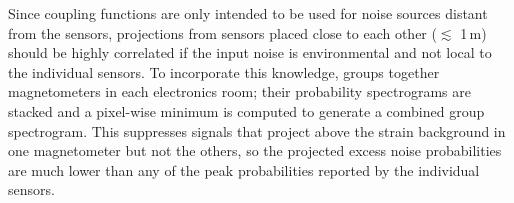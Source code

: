 Since coupling functions are only intended to be used for noise sources distant from the sensors, projections from sensors placed close to each other ($\lesssim$ 1\,m) should be highly correlated if the input noise is environmental and not local to the individual sensors.
To incorporate this knowledge,  groups together magnetometers in each electronics room; their probability spectrograms are stacked and a pixel-wise minimum is computed to generate a combined group spectrogram.
This suppresses signals that project above the strain background in one magnetometer but not the others, so the projected excess noise probabilities are much lower than any of the peak probabilities reported by the individual sensors.
